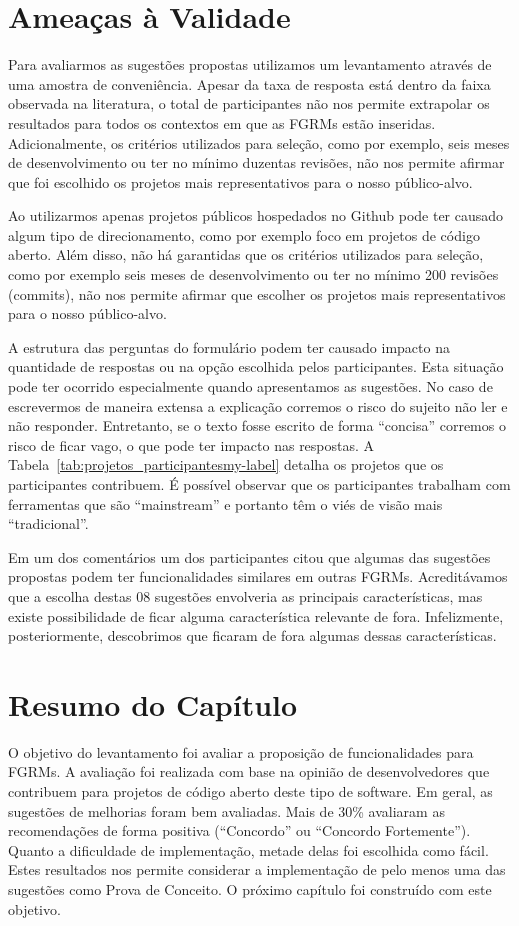 \section{Ameaças à Validade}
\label{sec:sug_melhoria_ameacas}

Para avaliarmos as sugestões propostas utilizamos um levantamento através de uma
amostra de conveniência. Apesar da taxa de resposta está dentro da faixa
observada na literatura, o total de participantes não nos permite extrapolar os
resultados para todos os contextos em que as FGRMs estão inseridas.
Adicionalmente, os critérios utilizados para seleção, como por exemplo, seis
meses de desenvolvimento ou ter no mínimo duzentas revisões, não nos permite
afirmar que foi escolhido os projetos mais representativos para o nosso
público-alvo.

Ao utilizarmos apenas projetos públicos hospedados no Github pode ter causado
algum tipo de direcionamento, como por exemplo foco em projetos de código
aberto. Além disso, não há garantidas que os critérios utilizados para seleção,
como por exemplo seis meses de desenvolvimento ou ter no mínimo 200 revisões
(commits), não nos permite afirmar que escolher os projetos mais
representativos para o nosso público-alvo.

A estrutura das perguntas do formulário podem ter causado impacto na quantidade
de respostas ou na opção escolhida pelos participantes. Esta situação pode ter
ocorrido especialmente quando apresentamos as sugestões. No caso de escrevermos
de maneira extensa a explicação corremos o risco do sujeito não ler e não
responder. Entretanto, se o texto fosse escrito de forma ``concisa'' corremos o
risco de ficar vago, o que pode ter impacto nas respostas. A
Tabela~\ref{tab:projetos_participantesmy-label} detalha os projetos que os
participantes contribuem. É possível observar que os participantes trabalham com
ferramentas que são ``mainstream'' e portanto têm o viés de visão mais
``tradicional''.

Em um dos comentários um dos participantes citou que algumas das sugestões
propostas podem ter funcionalidades similares em outras FGRMs. Acreditávamos que
a escolha destas 08 sugestões envolveria as principais características, mas
existe possibilidade de ficar alguma característica relevante de fora.
Infelizmente, posteriormente, descobrimos que ficaram de fora algumas dessas
características.

\section{Resumo do Capítulo}
\label{sec:sug_melhoria_resumo}

O objetivo do levantamento foi avaliar a proposição de funcionalidades para
FGRMs. A avaliação foi realizada com base na opinião de desenvolvedores que
contribuem para projetos de código aberto deste tipo de software. Em geral, as
sugestões de melhorias foram bem avaliadas. Mais de 30\% avaliaram as
recomendações de forma positiva (``Concordo'' ou  ``Concordo Fortemente'').
Quanto a dificuldade de implementação, metade delas foi escolhida como fácil.
Estes resultados nos permite considerar a implementação de pelo menos uma das
sugestões como Prova de Conceito. O próximo capítulo foi construído com este
objetivo.
